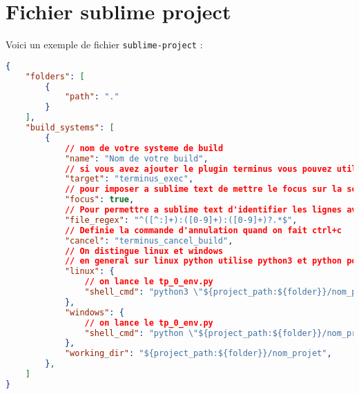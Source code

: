 \documentclass[a4paper,12pt]{article}
\begin{document}
\section{Fichier sublime project}
\label{sec:fichier_sublime_project}

Voici un exemple de fichier \texttt{sublime-project} :
\begin{lstlisting}[language=json]
{
    "folders": [
        {
            "path": "."
        }
    ],
    "build_systems": [
        {
            // nom de votre systeme de build
            "name": "Nom de votre build",
            // si vous avez ajouter le plugin terminus vous pouvez utiliser cette extension
            "target": "terminus_exec",
            // pour imposer a sublime text de mettre le focus sur la sortie console 
            "focus": true,
            // Pour permettre a sublime text d'identifier les lignes avec des erreurs
            "file_regex": "^([^:]+):([0-9]+):([0-9]+)?.*$",
            // Definie la commande d'annulation quand on fait ctrl+c
            "cancel": "terminus_cancel_build",
            // On distingue linux et windows 
            // en general sur linux python utilise python3 et python pour window
            "linux": {
                // on lance le tp_0_env.py
                "shell_cmd": "python3 \"${project_path:${folder}}/nom_projet/tp_0_env.py\""
            },
            "windows": {
                // on lance le tp_0_env.py
                "shell_cmd": "python \"${project_path:${folder}}/nom_projet/tp_0_env.py\""
            },
            "working_dir": "${project_path:${folder}}/nom_projet",
        },
    ]
}
\end{lstlisting}
\end{document}
